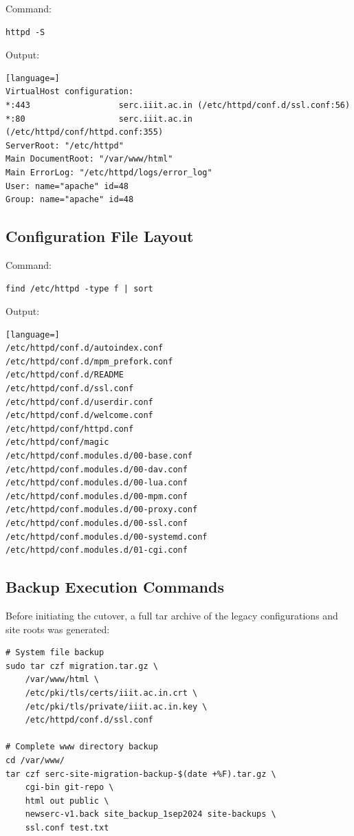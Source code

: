 \documentclass[11pt,a4paper,DIV=16,headings=normal,parskip=half]{scrartcl}
\begin{document}
Command:
\begin{lstlisting}
httpd -S
\end{lstlisting}
Output:
\begin{lstlisting}[language=]
VirtualHost configuration:
*:443                  serc.iiit.ac.in (/etc/httpd/conf.d/ssl.conf:56)
*:80                   serc.iiit.ac.in (/etc/httpd/conf/httpd.conf:355)
ServerRoot: "/etc/httpd"
Main DocumentRoot: "/var/www/html"
Main ErrorLog: "/etc/httpd/logs/error_log"
User: name="apache" id=48
Group: name="apache" id=48
\end{lstlisting}

\subsection{Configuration File Layout}
Command:
\begin{lstlisting}
find /etc/httpd -type f | sort
\end{lstlisting}
Output:
\begin{lstlisting}[language=]
/etc/httpd/conf.d/autoindex.conf
/etc/httpd/conf.d/mpm_prefork.conf
/etc/httpd/conf.d/README
/etc/httpd/conf.d/ssl.conf
/etc/httpd/conf.d/userdir.conf
/etc/httpd/conf.d/welcome.conf
/etc/httpd/conf/httpd.conf
/etc/httpd/conf/magic
/etc/httpd/conf.modules.d/00-base.conf
/etc/httpd/conf.modules.d/00-dav.conf
/etc/httpd/conf.modules.d/00-lua.conf
/etc/httpd/conf.modules.d/00-mpm.conf
/etc/httpd/conf.modules.d/00-proxy.conf
/etc/httpd/conf.modules.d/00-ssl.conf
/etc/httpd/conf.modules.d/00-systemd.conf
/etc/httpd/conf.modules.d/01-cgi.conf
\end{lstlisting}

\subsection{Backup Execution Commands}
Before initiating the cutover, a full tar archive of the legacy configurations and site roots was generated:
\begin{lstlisting}
# System file backup
sudo tar czf migration.tar.gz \
    /var/www/html \
    /etc/pki/tls/certs/iiit.ac.in.crt \
    /etc/pki/tls/private/iiit.ac.in.key \
    /etc/httpd/conf.d/ssl.conf

# Complete www directory backup
cd /var/www/
tar czf serc-site-migration-backup-$(date +%F).tar.gz \
    cgi-bin git-repo \
    html out public \
    newserc-v1.back site_backup_1sep2024 site-backups \
    ssl.conf test.txt
\end{lstlisting}
\end{document}
